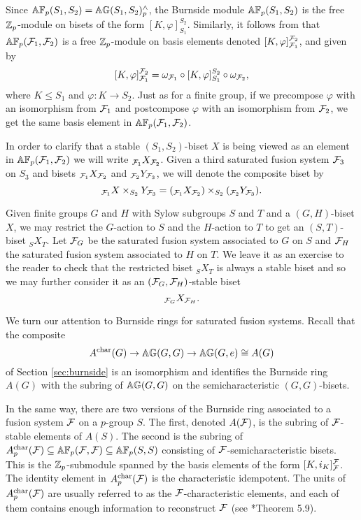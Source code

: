 \documentclass[10pt]{amsart}
\theoremstyle{definition}
\renewcommand{\phi}{\varphi}
\begin{document}
Since $\mathbb{A} \mathbb{F}_p(S_1,S_2) = \mathbb{A} \mathbb{G}(S_1,S_2)^\wedge_p$, the Burnside module $\mathbb{A} \mathbb{F}_p(S_1,S_2)$ is the free $\mathbb{Z}_p$-module on bisets of the form $[K, \phi]_{S_1}^{S_2}$. Similarly, it follows from \cite[Proposition 5.2]{Ragnarsson} that $\mathbb{A} \mathbb{F}_p(\mathcal{F}_1,\mathcal{F}_2)$ is a free $\mathbb{Z}_p$-module on basis elements denoted $[K,\phi]_{\cF_1}^{\cF_2}$, and given by
\[
[K,\phi]_{\cF_1}^{\cF_2} = \omega_{\cF_1} \circ [K,\phi]_{S_1}^{S_2} \circ \omega_{\cF_2},
\]
where $K\leq S_1$ and $\phi\colon K\to S_2$. Just as for a finite group, if we precompose $\phi$ with an isomorphism from $\mathcal{F}_1$ and postcompose $\phi$ with an isomorphism from $\mathcal{F}_2$, we get the same basis element in $\mathbb{A} \mathbb{F}_p(\mathcal{F}_1,\mathcal{F}_2)$.

In order to clarify that a stable $(S_1,S_2)$-biset $X$ is being viewed as an element in $\mathbb{A} \mathbb{F}_p(\mathcal{F}_1, \mathcal{F}_2)$ we will write ${}_{\mathcal{F}_1}X_{\mathcal{F}_2}$. Given a third saturated fusion system $\mathcal{F}_3$ on $S_3$ and bisets ${}_{\mathcal{F}_1}X_{\mathcal{F}_2}$ and ${}_{\mathcal{F}_2}Y_{\mathcal{F}_3}$, we will denote the composite biset by
\[
{}_{\mathcal{F}_1}X \times_{S_2} Y_{\mathcal{F}_3} = ({}_{\mathcal{F}_1}X_{\mathcal{F}_2}) \times_{S_2} ({}_{\mathcal{F}_2}Y_{\mathcal{F}_3}).
\]

Given finite groups $G$ and $H$ with Sylow subgroups $S$ and $T$ and a $(G,H)$-biset $X$, we may restrict the $G$-action to $S$ and the $H$-action to $T$ to get an $(S,T)$-biset ${}_{S}X_{T}$. Let $\mathcal{F}_G$ be the saturated fusion system associated to $G$ on $S$ and $\mathcal{F}_H$ the saturated fusion system associated to $H$ on $T$. We leave it as an exercise to the reader to check that the restricted biset  ${}_{S}X_{T}$ is always a stable biset and so we may further consider it as an $(\mathcal{F}_G, \mathcal{F}_H)$-stable biset
\[
{}_{\mathcal{F}_G}X_{\mathcal{F}_H}.
\]

We turn our attention to Burnside rings for saturated fusion systems. Recall that the composite
\[
A^{\text{char}}(G) \rightarrow \mathbb{A} \mathbb{G}(G,G) \rightarrow \mathbb{A} \mathbb{G}(G,e) \cong A(G)
\]
of Section \ref{sec:burnside} is an isomorphism and identifies the Burnside ring $A(G)$ with the subring of $\mathbb{A} \mathbb{G}(G,G)$ on the semicharacteristic $(G,G)$-bisets.


In the same way, there are two versions of the Burnside ring associated to a fusion system $\mathcal{F}$ on a $p$-group $S$. The first, denoted $A(\mathcal{F})$, is the subring of $\mathcal{F}$-stable elements of $A(S)$. The second is the subring of $A_{p}^{\text{char}}(\mathcal{F}) \subseteq \mathbb{A} \mathbb{F}_p(\mathcal{F},\mathcal{F}) \subseteq \mathbb{A} \mathbb{F}_p(S,S)$ consisting of $\mathcal{F}$-semicharacteristic bisets. This is the $\mathbb{Z}_p$-submodule spanned by the basis elements of the form $[K,i_K]_{\mathcal{F}}^{\mathcal{F}}$. The identity element in $A_{p}^{\text{char}}(\mathcal{F})$ is the characteristic idempotent. The units of $A_{p}^{\text{char}}(\mathcal{F})$ are usually referred to as the $\mathcal{F}$-characteristic elements, and each of them contains enough information to reconstruct $\mathcal{F}$ (see \cite{RagnarssonStancu}*{Theorem 5.9}).
\end{document}
